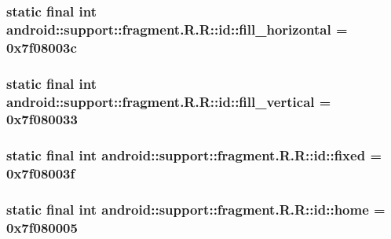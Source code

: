 \hypertarget{classandroid_1_1support_1_1fragment_1_1_r_1_1id_5da2dc3a8dd8d89cd7ed2be928dee268}{
\subsubsection[{fill\_\-horizontal}]{\setlength{\rightskip}{0pt plus 5cm}static final int android::support::fragment.R.R::id::fill\_\-horizontal = 0x7f08003c}}
\label{classandroid_1_1support_1_1fragment_1_1_r_1_1id_5da2dc3a8dd8d89cd7ed2be928dee268}


\hypertarget{classandroid_1_1support_1_1fragment_1_1_r_1_1id_f74fc01e5a9c84c0edc09a6bd59e9d47}{
\subsubsection[{fill\_\-vertical}]{\setlength{\rightskip}{0pt plus 5cm}static final int android::support::fragment.R.R::id::fill\_\-vertical = 0x7f080033}}
\label{classandroid_1_1support_1_1fragment_1_1_r_1_1id_f74fc01e5a9c84c0edc09a6bd59e9d47}


\hypertarget{classandroid_1_1support_1_1fragment_1_1_r_1_1id_749a6bb723747d9acc7edbac28746153}{
\subsubsection[{fixed}]{\setlength{\rightskip}{0pt plus 5cm}static final int android::support::fragment.R.R::id::fixed = 0x7f08003f}}
\label{classandroid_1_1support_1_1fragment_1_1_r_1_1id_749a6bb723747d9acc7edbac28746153}


\hypertarget{classandroid_1_1support_1_1fragment_1_1_r_1_1id_c5c41cfabf1c47927ae5bc63679ef44f}{
\subsubsection[{home}]{\setlength{\rightskip}{0pt plus 5cm}static final int android::support::fragment.R.R::id::home = 0x7f080005}}
\label{classandroid_1_1support_1_1fragment_1_1_r_1_1id_c5c41cfabf1c47927ae5bc63679ef44f}


